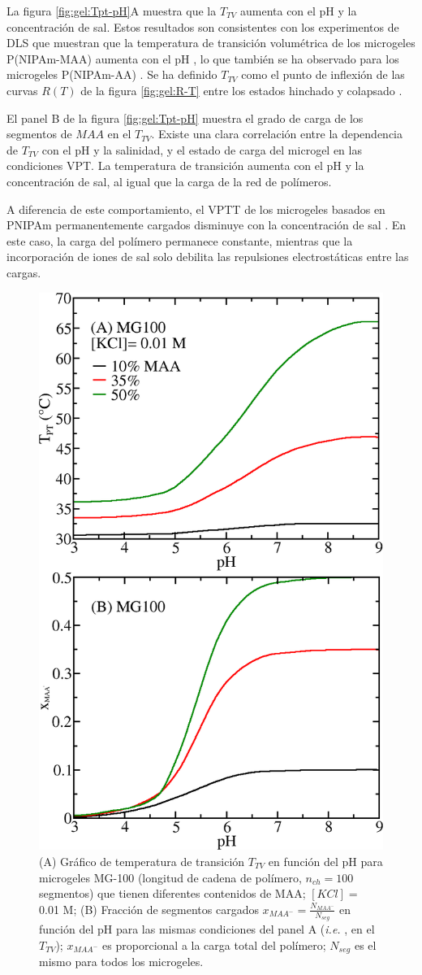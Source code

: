 La figura \ref{fig:gel:Tpt-pH}A muestra que la $T_{TV}$ aumenta con el pH y la concentraci\'on de sal. Estos resultados son consistentes con los experimentos de DLS que muestran que la temperatura de transici\'on volum\'etrica de los microgeles P(NIPAm-MAA) aumenta con el pH \cite{Kleinen2008}, lo que tambi\'en se ha observado para los microgeles P(NIPAm-AA) \cite{CaprilesGonzalez2008}. Se ha definido $T_{TV}$ como el punto de inflexi\'on de las curvas $R(T)$ de la figura \ref{fig:gel:R-T} entre los estados hinchado y colapsado \cite{Kratz2001}.

El panel B de la figura \ref{fig:gel:Tpt-pH} muestra el grado de carga de los segmentos de $MAA$ en el $T_{TV}$. Existe una clara correlaci\'on entre la dependencia de $T_{TV}$ con el pH y la salinidad, y el estado de carga del microgel en las condiciones VPT. La temperatura de transici\'on aumenta con el pH y la concentraci\'on de sal, al igual que la carga de la red de pol\'imeros.

A diferencia de este comportamiento, el VPTT de los microgeles basados en PNIPAm permanentemente cargados disminuye con la concentraci\'on de sal \cite{Lopez2020}. En este caso, la carga del pol\'imero permanece constante, mientras que la incorporaci\'on de iones de sal solo debilita las repulsiones electrost\'aticas entre las cargas.

\begin{figure}[!tb]
	\centering
	\includegraphics[width=0.40\linewidth]{Figures/graph-gel/Tpt-pH_MAA.png}
	\caption{(A) Gr\'afico de temperatura de transici\'on $T_{TV}$ en funci\'on del pH para microgeles MG-100 (longitud de cadena de pol\'imero, $n_{ch}=100$ segmentos) que tienen diferentes contenidos de MAA; $[KCl]=$ 0.01 M;
	(B) Fracci\'on de segmentos cargados $x_{MAA^-}=\frac{N_{MAA^-}}{N_{seg}}$ en funci\'on del pH para las mismas condiciones del panel A (\emph{i.e.} , en el $T_{TV}$); $x_{MAA^-}$ es proporcional a la carga total del pol\'imero; $N_{seg}$ es el mismo para todos los microgeles.}
	\label{fig:gel:Tpt_MAA}
\end{figure}

